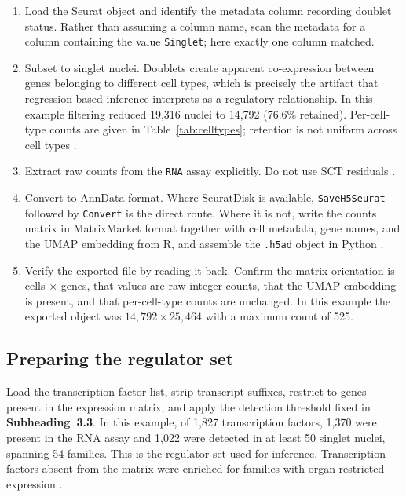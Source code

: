 \begin{enumerate}[leftmargin=*]
\item Load the Seurat object and identify the metadata column recording doublet status. Rather than assuming a column name, scan the metadata for a column containing the value \texttt{Singlet}; here exactly one column matched.

\item Subset to singlet nuclei. Doublets create apparent co-expression between genes belonging to different cell types, which is precisely the artifact that regression-based inference interprets as a regulatory relationship. In this example filtering reduced 19,316 nuclei to 14,792 (76.6\% retained). Per-cell-type counts are given in Table~\ref{tab:celltypes}; retention is not uniform across cell types .

\item Extract raw counts from the \texttt{RNA} assay explicitly. Do not use SCT residuals .

\item Convert to AnnData format. Where SeuratDisk is available, \texttt{SaveH5Seurat} followed by \texttt{Convert} is the direct route. Where it is not, write the counts matrix in MatrixMarket format together with cell metadata, gene names, and the UMAP embedding from R, and assemble the \texttt{.h5ad} object in Python .

\item Verify the exported file by reading it back. Confirm the matrix orientation is cells $\times$ genes, that values are raw integer counts, that the UMAP embedding is present, and that per-cell-type counts are unchanged. In this example the exported object was $14{,}792 \times 25{,}464$ with a maximum count of 525.
\end{enumerate}

\subsection{Preparing the regulator set}

Load the transcription factor list, strip transcript suffixes, restrict to genes present in the expression matrix, and apply the detection threshold fixed in \textbf{Subheading~3.3}. In this example, of 1,827 transcription factors, 1,370 were present in the RNA assay and 1,022 were detected in at least 50 singlet nuclei, spanning 54 families. This is the regulator set used for inference. Transcription factors absent from the matrix were enriched for families with organ-restricted expression .

